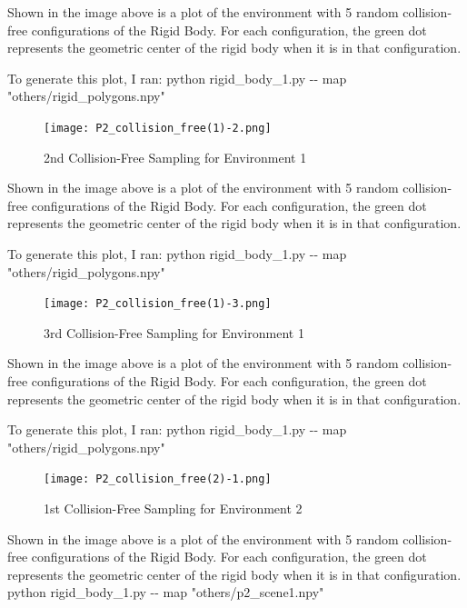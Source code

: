 \documentclass{article}
\begin{document}
Shown in the image above is a plot of the environment with 5 random collision-free configurations of the Rigid Body. For each configuration, the green dot represents the geometric center of the rigid body when it is in that configuration. \newline 

To generate this plot, I ran: \newline 
python rigid\_body\_1.py -\-- map "others/rigid\_polygons.npy"


\newpage 
\begin{figure}[h!]
	\texttt{[image: P2\_collision\_free(1)-2.png]}
	\centering
	\caption{2nd Collision-Free Sampling for Environment 1}
	\label{P2_collision_free(1)-2.png}
\end{figure}
Shown in the image above is a plot of the environment with 5 random collision-free configurations of the Rigid Body. For each configuration, the green dot represents the geometric center of the rigid body when it is in that configuration. \newline 

To generate this plot, I ran: \newline 
python rigid\_body\_1.py -\-- map "others/rigid\_polygons.npy"


\newpage 
\begin{figure}[h!]
	\texttt{[image: P2\_collision\_free(1)-3.png]}
	\centering
	\caption{3rd Collision-Free Sampling for Environment 1}
	\label{P2_collision_free(1)-3.png}
\end{figure}
Shown in the image above is a plot of the environment with 5 random collision-free configurations of the Rigid Body. For each configuration, the green dot represents the geometric center of the rigid body when it is in that configuration. 

To generate this plot, I ran: \newline 
python rigid\_body\_1.py -\-- map "others/rigid\_polygons.npy"


\newpage 
\begin{figure}[h!]
	\texttt{[image: P2\_collision\_free(2)-1.png]}
	\centering
	\caption{1st Collision-Free Sampling for Environment 2}
	\label{P2_collision_free(2)-1.png}
\end{figure}
Shown in the image above is a plot of the environment with 5 random collision-free configurations of the Rigid Body. For each configuration, the green dot represents the geometric center of the rigid body when it is in that configuration. 
python rigid\_body\_1.py -\-- map "others/p2\_scene1.npy"
\end{document}
